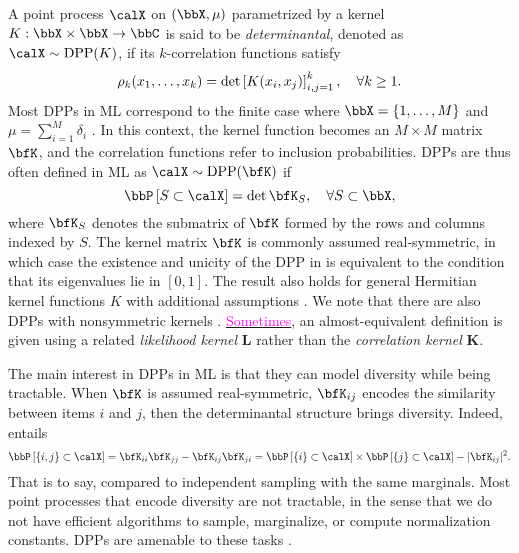 \documentclass[twoside,11pt]{article}
\begin{document}
        A point process $\calX$ on $(\bbX,\mu)$ parametrized by a kernel $K:\bbX\times \bbX\rightarrow \bbC$ is said to be \emph{determinantal}, denoted as $\calX\sim\DPP(K)$, if its $k$-correlation functions satisfy
        \begin{equation*}
            \label{eq:k-correlation_function_DPP}
            \rho_k(x_1,\dots,x_k)
              = \det \left[ K(x_i, x_j) \right]_{i,j=1}^k,
            \quad \forall k\geq 1.
        \end{equation*}
        Most DPPs in ML correspond to the finite case where $\bbX = \lrcb{1,\dots,M}$ and $\mu=\sum_{i=1}^M \delta_i$ \citep{KuTa12}.
        In this context, the kernel function becomes an $M\times M$ matrix $\bfK$, and the correlation functions refer to inclusion probabilities.
        DPPs are thus often defined in ML as $\calX\sim \DPP(\bfK)$ if
        \begin{equation}
        \label{eq:inclusion_proba_finite}
            \Proba{S \subset \calX} = \det {\bfK}_S,
                \quad\forall S\subset \bbX,
        \end{equation}
        where ${\bfK}_S$ denotes the submatrix of $\bfK$ formed by the rows and columns indexed by $S$.
        The kernel matrix $\bfK$ is commonly assumed real-symmetric, in which case the existence and unicity of the DPP in  is equivalent to the condition that its eigenvalues lie in $[0,1]$.
        The result also holds for general Hermitian kernel functions $K$ with additional assumptions \cite[Theorem 3]{Sos00}.
        We note that there are also DPPs with nonsymmetric kernels \citep{BoDiFu10}.
        \href{https://dppy.readthedocs.io/en/latest/finite_dpps/definition.html}{\textcolor{magenta}{Sometimes}}, an almost-equivalent definition is given using a related \emph{likelihood kernel} $\mathbf{L}$ rather than the \emph{correlation kernel} $\mathbf{K}$.

        The main interest in DPPs in ML is that they can model diversity while being tractable.
        When $\bfK$ is assumed real-symmetric, ${\bfK}_{ij}$ encodes the similarity between items $i$ and $j$, then the determinantal structure brings diversity.
        Indeed,  entails
        \begin{equation*}
        \label{eq:2point_correlation_function_inclusion_proba_finite_case}
          \Proba{\{i,j\} \subset \calX}
            = {\bfK}_{ii}{\bfK}_{jj}-{\bfK}_{ij}{\bfK}_{ji}
            = \Proba{\{i\} \subset \calX}
              \times \Proba{\{j\} \subset \calX}
                - |{\bfK}_{ij}|^2.
        \end{equation*}
        That is to say, compared to independent sampling with the same marginals.
        Most point processes that encode diversity are not tractable, in the sense that we do not have efficient algorithms to sample, marginalize, or compute normalization constants.
        DPPs are amenable to these tasks \citep{KuTa12,Gil14}.
\end{document}
